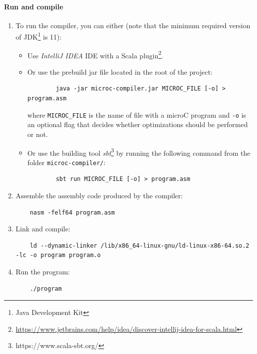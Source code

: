\documentclass[thesis=M,english]{FITthesis}[2019/12/23]
\begin{document}
\paragraph*{Run and compile}
\begin{enumerate}
    \item To run the compiler, you can either (note that the minimum required version of JDK\footnote{Java Development Kit} is 11):
    \begin{itemize}
        \item Use \emph{IntelliJ IDEA} IDE with a Scala
        plugin\footnote{\url{https://www.jetbrains.com/help/idea/discover-intellij-idea-for-scala.html}}.
        
        \item Or use the prebuild jar file located in the root of the project:
        \begin{verbatim}
        java -jar microc-compiler.jar MICROC_FILE [-o] > program.asm
        \end{verbatim}
        where \texttt{MICROC\_FILE} is the name of file with a microC program and \texttt{-o} is an optional flag that decides whether optimizations should be performed or not.
        
        \item Or use the building tool \emph{sbt}\footnote{https://www.scala-sbt.org/} by running the following command from the folder \texttt{microc-compiler/}:
        \begin{verbatim}
        sbt run MICROC_FILE [-o] > program.asm
        \end{verbatim}
    \end{itemize}
    
    \item Assemble the assembly code produced by the compiler:
    \begin{verbatim}
    nasm -felf64 program.asm
    \end{verbatim}
    
    \item Link and compile:
    \begin{verbatim}
    ld --dynamic-linker /lib/x86_64-linux-gnu/ld-linux-x86-64.so.2 -lc -o program program.o
    \end{verbatim}
    
    \item Run the program:
    \begin{verbatim}
    ./program
    \end{verbatim}
\end{enumerate}
\end{document}
